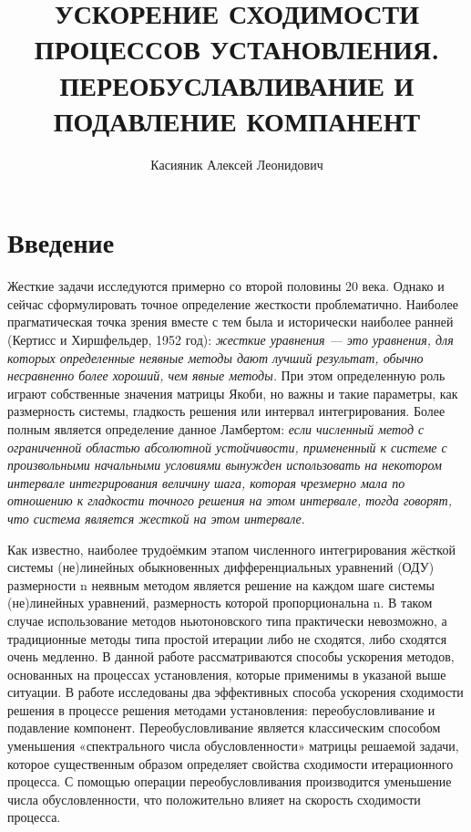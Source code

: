 \documentclass[a4paper,12pt]{report}
\title{УСКОРЕНИЕ СХОДИМОСТИ ПРОЦЕССОВ УСТАНОВЛЕНИЯ. ПЕРЕОБУСЛАВЛИВАНИЕ И ПОДАВЛЕНИЕ КОМПАНЕНТ}
\author{Касияник Алексей Леонидович}
\begin{document}
  \maketitle

  {
    \renewcommand{\contentsname}{Содержание}
    \tableofcontents
  }

  \chapter*{Введение}
  Жесткие задачи исследуются примерно со второй половины 20 века. Однако и сейчас сформулировать точное определение жесткости проблематично. Наиболее прагматическая точка зрения вместе с тем была и исторически наиболее ранней (Кертисс и Хиршфельдер, 1952 год): \textit{жесткие уравнения — это уравнения, для которых определенные неявные методы дают лучший результат, обычно несравненно более хороший, чем явные методы.} При этом определенную роль играют собственные значения матрицы Якоби, но важны и такие параметры, как размерность системы, гладкость решения или интервал интегрирования. 
Более полным является определение данное Ламбертом: \textit{если численный метод с ограниченной областью абсолютной устойчивости, примененный к системе с произвольными начальными условиями вынужден использовать на некотором интервале интегрирования величину шага, которая чрезмерно мала по отношению к гладкости точного решения на этом интервале, тогда говорят, что система является жесткой на этом интервале}.


Как известно, наиболее трудоёмким этапом численного интегрирования жёсткой системы (не)линейных обыкновенных дифференциальных уравнений (ОДУ) размерности n неявным методом является решение на каждом шаге системы (не)линейных уравнений, размерность которой пропорциональна n. В таком случае использование методов ньютоновского типа практически невозможно, а традиционные методы типа простой итерации либо не сходятся, либо сходятся очень медленно. В данной работе рассматриваются способы ускорения методов, основанных на процессах установления, которые применимы в указаной выше ситуации.
В работе исследованы два эффективных способа ускорения сходимости решения в процессе решения методами установления: переобусловливание и подавление компонент. Переобусловливание является классическим способом уменьшения «спектрального числа обусловленности» матрицы решаемой задачи, которое существенным образом определяет свойства сходимости итерационного процесса. С помощью операции переобусловливания производится уменьшение числа обусловленности, что положительно влияет на скорость сходимости процесса.
\end{document}
